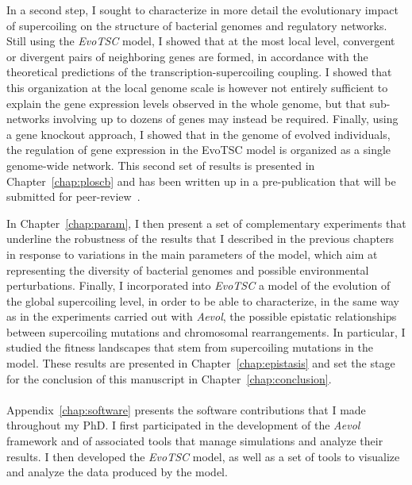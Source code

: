 In a second step, I sought to characterize in more detail the evolutionary impact of supercoiling on the structure of bacterial genomes and regulatory networks.
Still using the \emph{EvoTSC} model, I showed that at the most local level, convergent or divergent pairs of neighboring genes are formed, in accordance with the theoretical predictions of the transcription-supercoiling coupling.
I showed that this organization at the local genome scale is however not entirely sufficient to explain the gene expression levels observed in the whole genome, but that sub-networks involving up to dozens of genes may instead be required.
Finally, using a gene knockout approach, I showed that in the genome of evolved individuals, the regulation of gene expression in the EvoTSC model is organized as a single genome-wide network.
This second set of results is presented in Chapter~\ref{chap:ploscb} and has been written up in a pre-publication that will be submitted for peer-review~\citep{grohens2022b}.

In Chapter~\ref{chap:param}, I then present a set of complementary experiments that underline the robustness of the results that I described in the previous chapters in response to variations in the main parameters of the model, which aim at representing the diversity of bacterial genomes and possible environmental perturbations.
Finally, I incorporated into \emph{EvoTSC} a model of the evolution of the global supercoiling level, in order to be able to characterize, in the same way as in the experiments carried out with \emph{Aevol}, the possible epistatic relationships between supercoiling mutations and chromosomal rearrangements.
In particular, I studied the fitness landscapes that stem from supercoiling mutations in the model.
These results are presented in Chapter~\ref{chap:epistasis} and set the stage for the conclusion of this manuscript in Chapter~\ref{chap:conclusion}.

\paragraph{}
Appendix~\ref{chap:software} presents the software contributions that I made throughout my PhD.
I first participated in the development of the \emph{Aevol} framework and of associated tools that manage simulations and analyze their results.
I then developed the \emph{EvoTSC} model, as well as a set of tools to visualize and analyze the data produced by the model.

